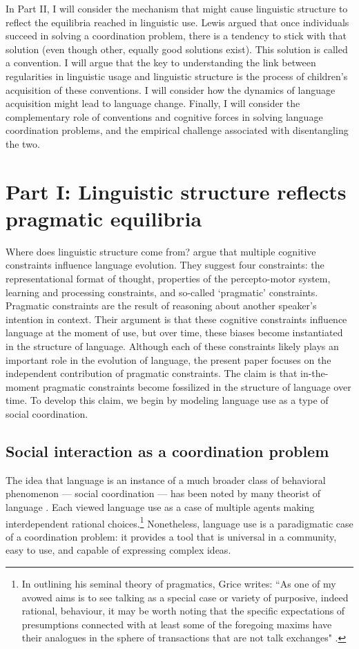 \documentclass[man, noapacite, 12pt]{apa2}
\begin{document}
In Part II, I will consider the mechanism that might cause linguistic structure to reflect the equilibria reached in linguistic use. Lewis argued that once individuals succeed in solving a coordination problem, there is a tendency to stick with that solution (even though other, equally good solutions exist). This solution is called a convention. I will argue that the key to understanding the link between regularities in linguistic usage and linguistic structure is the process of children's acquisition of these conventions. I will consider how the dynamics of language acquisition might lead to language change. Finally, I will consider the complementary role of conventions and cognitive forces in solving language coordination problems, and the  empirical challenge associated with disentangling the two.

\section{Part I: Linguistic structure reflects pragmatic equilibria}

Where does linguistic structure come from?  argue that  multiple cognitive constraints influence language evolution. They suggest four constraints: the representational format of thought, properties of the percepto-motor system, learning and processing constraints, and so-called `pragmatic' constraints. Pragmatic constraints are the result of reasoning about another speaker's intention in context. Their argument is that these  cognitive constraints  influence  language at the moment of use, but over time, these biases become instantiated in the structure of language. Although each of these constraints likely plays an important role in the evolution of language, the present paper focuses on the independent contribution of pragmatic constraints. The claim is that in-the-moment pragmatic constraints become fossilized in the structure of language over time. To develop this claim, we begin by modeling language use as a type of social coordination.

\subsection{Social interaction as a coordination problem}
The idea that language is an instance of a much broader class of behavioral phenomenon --- social coordination --- has been noted by many theorist of language \cite{zipf1936, lewis1969convention, grice1975logic, clark1996using}. Each viewed language use as a case of multiple agents making interdependent  rational choices.\footnote{In outlining his seminal theory of pragmatics, Grice  writes: ``As one of my avowed aims is to see talking as a special case or variety of purposive, indeed rational, behaviour, it may be worth noting that the specific expectations of presumptions connected with at least some of the foregoing maxims have their analogues in the sphere of transactions that are not talk exchanges" \cite[pg. 47]{grice1975logic}.} Nonetheless, language use is a paradigmatic case of a coordination problem: it provides a tool that is universal in a community, easy to use, and capable of expressing complex ideas.
\end{document}
